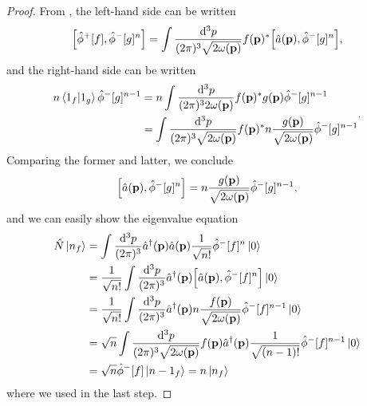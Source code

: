 \qkgnumbereigenstate
\begin{proof}
	From , the left-hand side can be written
	\begin{equation*}
		\comm{\hat\phi^+[f]}{\hat\phi^-[g]^n}
		=
		\int\frac{\dd[3]{p}}{(2\pi)^3\sqrt{2\omega(\vb{p})}}
		f(\vb{p})^*
		\comm{\hat{a}(\vb{p})}{\hat\phi^-[g]^n}
		,
	\end{equation*}
	and the right-hand side can be written
	\begin{equation*}
		\begin{split}
			n
			\braket{1_f}{1_g}
			\hat\phi^-[g]^{n-1}
			&=
			n
			\int\frac{\dd[3]{p}}{(2\pi)^32\omega(\vb{p})}
			f(\vb{p})^*
			g(\vb{p})
			\hat\phi^-[g]^{n-1}
			\\
			&=
			\int\frac{\dd[3]{p}}{(2\pi)^3\sqrt{2\omega(\vb{p})}}
			f(\vb{p})^*
			n
			\frac{g(\vb{p})}{\sqrt{2\omega(\vb{p})}}
			\hat\phi^-[g]^{n-1}
		\end{split}
		.
	\end{equation*}
	Comparing the former and latter, we conclude
	\begin{equation*}
		\comm{\hat{a}(\vb{p})}{\hat\phi^-[g]^n}		
		=
		n
		\frac{g(\vb{p})}{\sqrt{2\omega(\vb{p})}}
		\hat\phi^-[g]^{n-1}
		,
	\end{equation*}
	and we can easily show the eigenvalue equation
	\begin{equation*}
		\begin{split}
			\hat{N}
			\ket{n_f}
			&=
			\int\frac{\dd[3]{p}}{(2\pi)^3}
			\hat{a}^\dagger(\vb{p})
			\hat{a}(\vb{p})
			\frac{1}{\sqrt{n!}}
			\hat\phi^-[f]^n
			\ket{0}
			\\
			&=
			\frac{1}{\sqrt{n!}}
			\int\frac{\dd[3]{p}}{(2\pi)^3}
			\hat{a}^\dagger(\vb{p})
			\comm{\hat{a}(\vb{p})}{\hat\phi^-[f]^n}
			\ket{0}
			\\
			&=
			\frac{1}{\sqrt{n!}}
			\int\frac{\dd[3]{p}}{(2\pi)^3}
			\hat{a}^\dagger(\vb{p})
			n
			\frac{f(\vb{p})}{\sqrt{2\omega(\vb{p})}}
			\hat\phi^-[f]^{n-1}
			\ket{0}
			\\
			&=
			\sqrt{n}
			\int\frac{\dd[3]{p}}{(2\pi)^3\sqrt{2\omega(\vb{p})}}
				f(\vb{p})
			\hat{a}^\dagger(\vb{p})
			\frac{1}{\sqrt{(n-1)!}}
			\hat\phi^-[f]^{n-1}
			\ket{0}
			\\
			&=
			\sqrt{n}
			\hat\phi^-[f]
			\ket{n-1_f}
			=
			n
			\ket{n_f}
		\end{split}
	\end{equation*}
	where we used  in the last step.
\end{proof}

